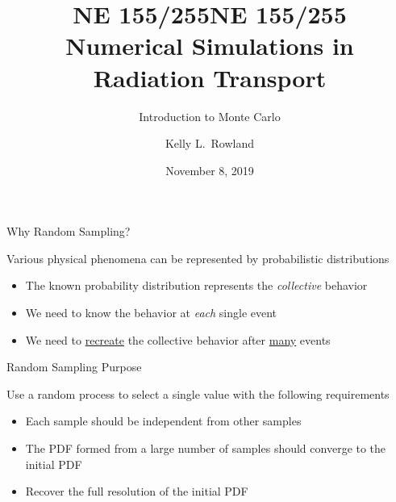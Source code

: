 \documentclass[xcolor=x11names,compress,handout]{beamer}
\title{NE 155/255}
\author{Kelly L.\ Rowland}
\date{November 8, 2019}
\renewcommand{\(}{\begin{columns}}
\renewcommand{\)}{\end{columns}}
\newcommand{\<}[1]{\begin{column}{#1}}
\renewcommand{\>}{\end{column}}
\begin{document}
\begin{frame}
\title{NE 155/255\\Numerical Simulations in Radiation Transport}
\subtitle{Introduction to Monte Carlo}
\titlepage
\end{frame}

\begin{frame}{Why Random Sampling?}

Various physical phenomena can be
represented by probabilistic distributions

\begin{itemize}
    \item The known probability distribution
represents the \textit{collective} behavior
\vspace*{1em}
    \item We need to know the behavior at \textit{each}
single event
\vspace*{1em}
    \item We need to \underline{recreate} the collective behavior after \underline{many} events
\end{itemize}

\end{frame}


\begin{frame}{Random Sampling Purpose}

Use a random process to select a single
value with the following requirements

\begin{itemize}
    \item Each sample should be independent from
other samples
\vspace*{1em}
    \item The PDF formed from a large number of
samples should converge to the initial PDF
\vspace*{1em}
    \item Recover the full resolution of the initial PDF
\end{itemize}

\end{frame}
\end{document}
